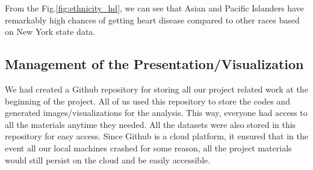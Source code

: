 \documentclass[journal,12pt,onecolumn]{IEEEtran}
\begin{document}
From the Fig.\ref{fig:ethnicity_hd}, we can see that Asian and Pacific Islanders have remarkably high chances of getting heart disease compared to other races based on New York state data.

\subsection{Management of the Presentation/Visualization}
We had created a Github repository for storing all our project related work at the beginning of the project.
All of us used this repository to store the codes and generated images/visualizations for the analysis.
This way, everyone had access to all the materials anytime they needed.
All the datasets were also stored in this repository for easy access.
Since Github is a cloud platform, it ensured that in the event all our local machines crashed for some reason, all the project materials would still persist on the cloud and be easily accessible.
\end{document}
